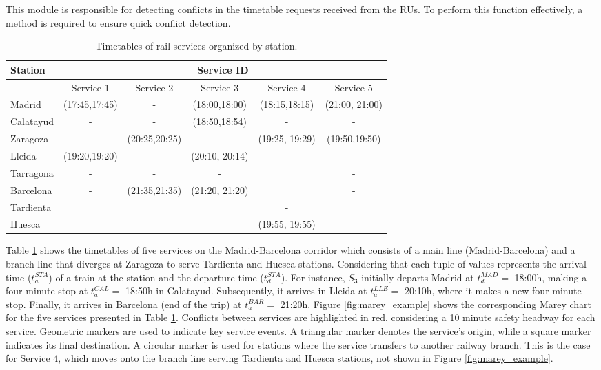 \documentclass[Afour,sagev,times]{sagej}
\begin{document}
This module is responsible for detecting conflicts in the timetable requests received from the \glspl{RU}. To perform this function effectively, a method is required to ensure quick conflict detection. 

\begin{table}[htbp]
\centering
\caption{Timetables of rail services organized by station.}
\begin{tabular}{@{}lccccc@{}}
\toprule
Station & \multicolumn{5}{c}{Service ID} \\ \midrule
 & Service 1 & Service 2 & Service 3 & Service 4 & Service 5 \\ \midrule
Madrid & (17:45,17:45) & - & (18:00,18:00) & (18:15,18:15) & (21:00, 21:00) \\
Calatayud & - & - & (18:50,18:54) & - & - \\
Zaragoza & - & (20:25,20:25) & - & (19:25, 19:29) & (19:50,19:50) \\
\midrule
Lleida & (19:20,19:20) & - & (20:10, 20:14) &  & - \\
Tarragona & - & - & - &  & - \\
Barcelona & - & (21:35,21:35) & (21:20, 21:20) &  & - \\ \midrule
Tardienta &  &  &  & - &  \\
Huesca &  &  &  & (19:55, 19:55) &  \\ \bottomrule
\end{tabular}
\label{tab:servicios_ferroviarios}
\end{table}

Table \ref{tab:servicios_ferroviarios} shows the timetables of five services on the Madrid-Barcelona corridor which consists of a main line (Madrid-Barcelona) and a branch line that diverges at Zaragoza to serve Tardienta and Huesca stations.  Considering that each tuple of values represents the arrival time ($t_a^{STA}$) of a train at the station and the departure time ($t_d^{STA}$). For instance, $S_3$ initially departs Madrid at $t_d^{MAD} =$ 18:00h, making a four-minute stop at $t_a^{CAL} =$ 18:50h in Calatayud. Subsequently, it arrives in Lleida at $t_a^{LLE} =$ 20:10h, where it makes a new four-minute stop. Finally, it arrives in Barcelona (end of the trip) at $t_a^{BAR} =$ 21:20h. Figure \ref{fig:marey_example} shows the corresponding Marey chart for the five services presented in Table \ref{tab:servicios_ferroviarios}. Conflicts between services are highlighted in red, considering a 10 minute safety headway for each service. Geometric markers are used to indicate key service events. A triangular marker denotes the service's origin, while a square marker indicates its final destination. A circular marker is used for stations where the service transfers to another railway branch. This is the case for Service 4, which moves onto the branch line serving Tardienta and Huesca stations, not shown in Figure \ref{fig:marey_example}.
\end{document}
